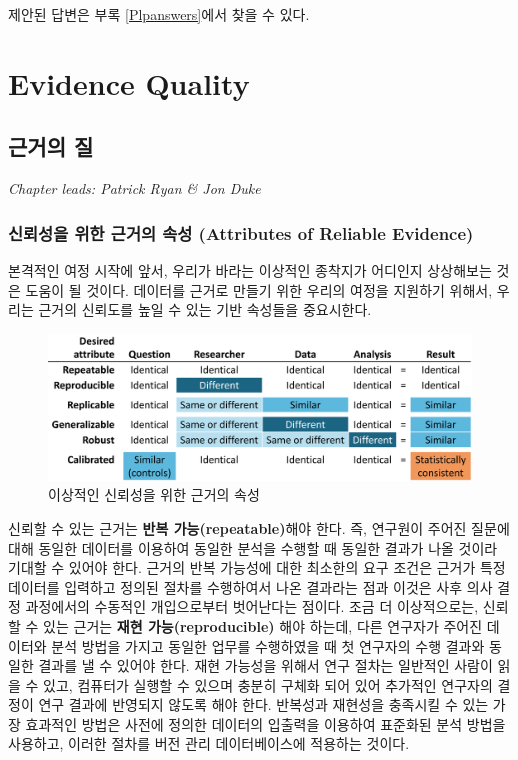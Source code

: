 \documentclass[11pt]{book}
\theoremstyle{definition}
\theoremstyle{definition}
\theoremstyle{definition}
\theoremstyle{remark}
\begin{document}
제안된 답변은 부록 \ref{Plpanswers}에서 찾을 수 있다.

\part{Evidence Quality}\label{part-evidence-quality}

\chapter{근거의 질}\label{EvidenceQuality}

\emph{Chapter leads: Patrick Ryan \& Jon Duke}


\section{신뢰성을 위한 근거의 속성 (Attributes of Reliable
Evidence)}\label{----attributes-of-reliable-evidence}

본격적인 여정 시작에 앞서, 우리가 바라는 이상적인 종착지가 어디인지
상상해보는 것은 도움이 될 것이다. 데이터를 근거로 만들기 위한 우리의
여정을 지원하기 위해서, 우리는 근거의 신뢰도를 높일 수 있는 기반
속성들을 중요시한다.

\begin{figure}

{\centering \includegraphics[width=1\linewidth]{images/EvidenceQuality/reliableevidenceattributes} 

}

\caption{이상적인 신뢰성을 위한 근거의 속성}\label{fig:attributesOfEvidence}
\end{figure}

신뢰할 수 있는 근거는 \textbf{반복 가능(repeatable)}해야 한다. 즉,
연구원이 주어진 질문에 대해 동일한 데이터를 이용하여 동일한 분석을
수행할 때 동일한 결과가 나올 것이라 기대할 수 있어야 한다. 근거의 반복
가능성에 대한 최소한의 요구 조건은 근거가 특정 데이터를 입력하고 정의된
절차를 수행하여서 나온 결과라는 점과 이것은 사후 의사 결정 과정에서의
수동적인 개입으로부터 벗어난다는 점이다. 조금 더 이상적으로는, 신뢰할 수
있는 근거는 \textbf{재현 가능(reproducible)} 해야 하는데, 다른 연구자가
주어진 데이터와 분석 방법을 가지고 동일한 업무를 수행하였을 때 첫
연구자의 수행 결과와 동일한 결과를 낼 수 있어야 한다. 재현 가능성을
위해서 연구 절차는 일반적인 사람이 읽을 수 있고, 컴퓨터가 실행할 수
있으며 충분히 구체화 되어 있어 추가적인 연구자의 결정이 연구 결과에
반영되지 않도록 해야 한다. 반복성과 재현성을 충족시킬 수 있는 가장
효과적인 방법은 사전에 정의한 데이터의 입출력을 이용하여 표준화된 분석
방법을 사용하고, 이러한 절차를 버전 관리 데이터베이스에 적용하는 것이다.
\end{document}
